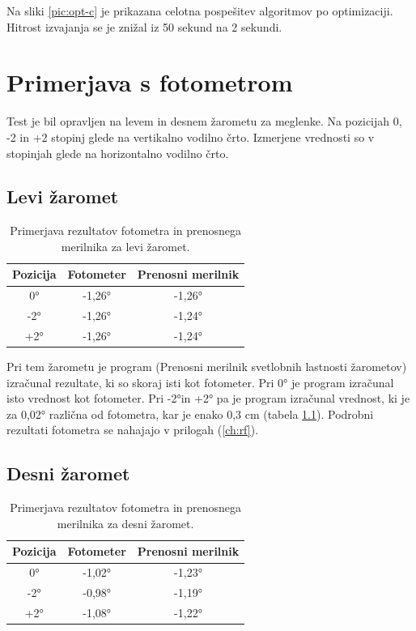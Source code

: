 \documentclass[oneside, a4paper, 12pt]{book}
\begin{document}
Na sliki \ref{pic:opt-c} je prikazana celotna pospešitev algoritmov po optimizaciji. Hitrost izvajanja se je znižal iz 50 sekund na 2 sekundi.

\chapter{Primerjava s fotometrom}
Test je bil opravljen na levem in desnem žarometu za meglenke. Na pozicijah 0, -2 in +2 stopinj glede na vertikalno vodilno črto. Izmerjene vrednosti so v stopinjah glede na horizontalno vodilno črto.

\section{Levi žaromet}

\begin{table}
\begin{center}
\begin{tabular}{c|c|c}
\textbf{Pozicija} & \textbf{Fotometer} & \textbf{Prenosni merilnik} \\ \hline
0° & -1,26° & -1,26°  \\ \hline
-2°  & -1,26° & -1,24°   \\ \hline
+2°  & -1,26° & -1,24°   \\ 
\end{tabular}
\end{center}
\caption{Primerjava rezultatov fotometra in prenosnega merilnika za levi žaromet.}
\label{tbl:primerjava-levi}
\end{table}

Pri tem žarometu je program (Prenosni merilnik svetlobnih lastnosti žarometov) izračunal rezultate, ki so skoraj isti kot fotometer. Pri 0° je program izračunal isto vrednost kot fotometer. Pri -2°in +2° pa je program izračunal vrednost, ki je za 0,02° različna od fotometra, kar je enako 0,3 cm (tabela \ref{tbl:primerjava-levi}). Podrobni rezultati fotometra se nahajajo v prilogah (\ref{ch:rf}).

\section{Desni žaromet}

\begin{table}
\begin{center}
\begin{tabular}{c|c|c}
\textbf{Pozicija} & \textbf{Fotometer} & \textbf{Prenosni merilnik} \\ \hline
0° & -1,02° & -1,23°  \\ \hline
-2°  & -0,98° & -1,19°   \\ \hline
+2°  & -1,08° & -1,22°   \\ 
\end{tabular}
\end{center}
\caption{Primerjava rezultatov fotometra in prenosnega merilnika za desni žaromet.}
\label{tbl:primerjava-desni}
\end{table}
\end{document}
